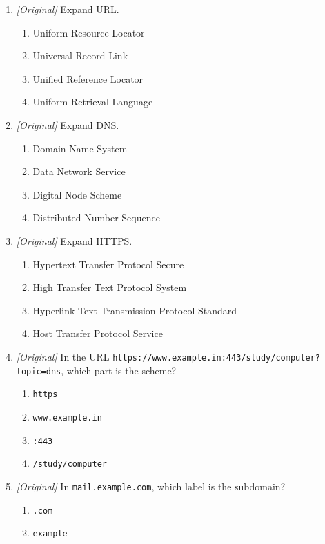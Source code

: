 \begin{enumerate}[label=\textbf{Q\arabic*.}, leftmargin=*]
\item \textit{[Original]} Expand URL.
  \begin{enumerate}[label=\Alph*.]
    \item Uniform Resource Locator
    \item Universal Record Link
    \item Unified Reference Locator
    \item Uniform Retrieval Language
  \end{enumerate}
\item \textit{[Original]} Expand DNS.
  \begin{enumerate}[label=\Alph*.]
    \item Domain Name System
    \item Data Network Service
    \item Digital Node Scheme
    \item Distributed Number Sequence
  \end{enumerate}
\item \textit{[Original]} Expand HTTPS.
  \begin{enumerate}[label=\Alph*.]
    \item Hypertext Transfer Protocol Secure
    \item High Transfer Text Protocol System
    \item Hyperlink Text Transmission Protocol Standard
    \item Host Transfer Protocol Service
  \end{enumerate}
\item \textit{[Original]} In the URL
  \texttt{https://www.example.in:443/study/computer?topic=dns}, which part
  is the scheme?
  \begin{enumerate}[label=\Alph*.]
    \item \texttt{https}
    \item \texttt{www.example.in}
    \item \texttt{:443}
    \item \texttt{/study/computer}
  \end{enumerate}
\item \textit{[Original]} In \texttt{mail.example.com}, which label is the
  subdomain?
  \begin{enumerate}[label=\Alph*.]
    \item \texttt{.com}
    \item \texttt{example}

\end{enumerate}
\end{enumerate}
